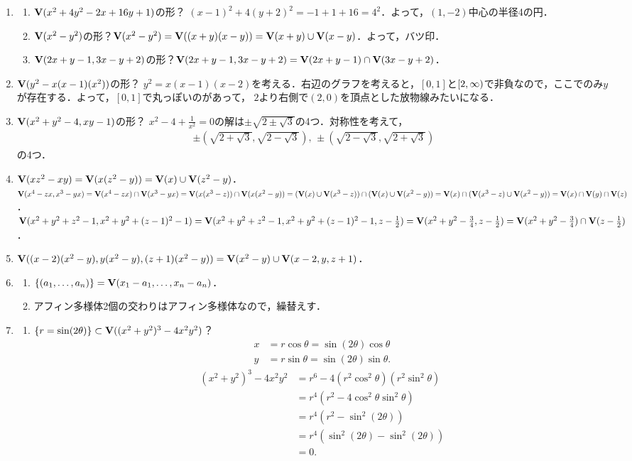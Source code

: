 \documentclass[9pt]{ltjsarticle}
\begin{document}
\begin{enumerate}[label=(問題\arabic*)]
 \item
\begin{enumerate}[label=(\alph*)]
 \item $\textbf V(x^2+4y^2-2x+16y+1)$の形？
$(x-1)^2 + 4(y+2)^2 = -1 + 1 + 16 = 4^2$．よって，$(1,-2)$中心の半径4の円．
 \item $\textbf V(x^2-y^2)$の形？$\textbf V(x^2-y^2)=\textbf V((x+y)(x-y))=\textbf V(x+y)\cup \textbf V(x-y)$．よって，バツ印．
 \item $\textbf V(2x+y-1,3x-y+2)$の形？$\textbf V(2x+y-1,3x-y+2)=\textbf V(2x+y-1)\cap \textbf V(3x-y+2)$．
\end{enumerate}
 \item $\textbf V(y^2-x(x-1)(x^2))$の形？
$y^2 = x(x-1)(x-2)$を考える．右辺のグラフを考えると，$[0,1]$と$\left[2,\infty\right)$で非負なので，ここでのみ$y$が存在する．よって，$[0,1]$で丸っぽいのがあって，
$2$より右側で$(2,0)$を頂点とした放物線みたいになる．
 \item $\textbf V(x^2+y^2-4,xy-1)$の形？
$x^2-4+\frac{1}{x^2}=0$の解は$\pm\sqrt{2\pm\sqrt{3}}$の4つ．対称性を考えて，
\begin{align}
 \pm(\sqrt{2+\sqrt{3}},\sqrt{2-\sqrt{3}}),\,
\pm(\sqrt{2-\sqrt{3}},\sqrt{2+\sqrt{3}})
\end{align}
の4つ．
 \item
$\textbf V(xz^2-xy)=\textbf V(x(z^2-y))=\textbf V(x)\cup \textbf V(z^2-y)$．
$\textbf V(x^4-zx,x^3-yx)=\textbf V(x^4-zx)\cap \textbf V(x^3-yx)=\textbf V(x(x^3-z))\cap \textbf V(x(x^2-y))=(\textbf V(x)\cup \textbf V(x^3-z))\cap (\textbf V(x)\cup \textbf V(x^2-y)) = \textbf V(x)\cap (\textbf V(x^3-z)\cup \textbf V(x^2-y))=\textbf V(x)\cap \textbf V(y)\cap \textbf V(z)$．
$\textbf V(x^2+y^2+z^2-1,x^2+y^2+(z-1)^2-1)=\textbf V(x^2+y^2+z^2-1,x^2+y^2+(z-1)^2-1,z-\frac{1}{2})=\textbf V(x^2+y^2-\frac{3}{4},z-\frac{1}{2})=\textbf V(x^2+y^2-\frac{3}{4})\cap \textbf V(z-\frac{1}{2})$．
 \item $\textbf V((x-2)(x^2-y),y(x^2-y),(z+1)(x^2-y))=\textbf V(x^2-y)\cup \textbf V(x-2,y,z+1)$．
 \item
\begin{enumerate}[label=(\alph*)]
 \item $\left\{(a_1,\dots,a_n)\right\}=\textbf V(x_1-a_1,\dots,x_n-a_n)$．
 \item アフィン多様体2個の交わりはアフィン多様体なので，繰替えす．
\end{enumerate}
 \item
\begin{enumerate}[label=(\alph*)]
 \item
 $\left\{r=\sin(2\theta)\right\}\subset \textbf V((x^2+y^2)^3-4x^2y^2)$？
\begin{align}
 x&=r\cos\theta = \sin(2\theta)\cos\theta\\
 y& =r\sin\theta = \sin(2\theta)\sin\theta.
\end{align}
\begin{align}
 (x^2+y^2)^3-4x^2y^2
&=
r^6 - 4(r^2\cos^2\theta)(r^2\sin^2\theta)\\
 & =
r^4(r^2-4\cos^2\theta \sin^2\theta)\\
 & =
r^4(r^2-\sin^2(2\theta))\\
 & =
r^4(\sin^2(2\theta)-\sin^2(2\theta))\\
 & =0.
\end{align}


\end{enumerate}
\end{enumerate}
\end{document}
